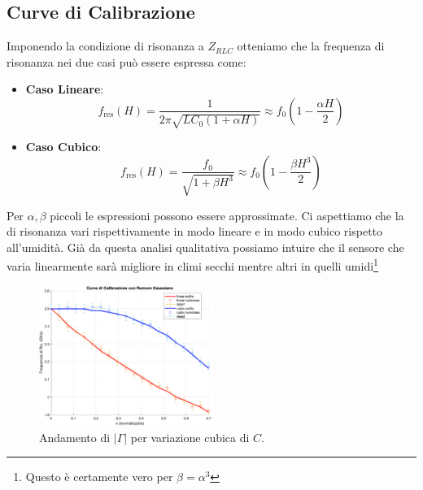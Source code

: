 \documentclass[conference]{IEEEtran}
\begin{document}
\subsection{Curve di Calibrazione}
Imponendo la condizione di risonanza a $Z_{RLC}$ otteniamo che la frequenza di risonanza nei due casi può essere espressa come:


\begin{itemize}
    \item \textbf{Caso Lineare}:
    \[
    f_{\text{res}}(H) = \frac{1}{2\pi\sqrt{L C_0 (1 + \alpha H)}} \approx f_0 \left(1 - \frac{\alpha H}{2}\right)
    \]
    \item \textbf{Caso Cubico}:
    \[
    f_{\text{res}}(H) = \frac{f_0}{\sqrt{1 + \beta H^3}} \approx f_0 \left(1 - \frac{\beta H^3}{2}\right)
    \]
\end{itemize}
Per $\alpha,\beta$ piccoli le espressioni possono essere approssimate. Ci aspettiamo che la di risonanza vari rispettivamente in modo lineare e in modo cubico rispetto all'umidità. Già da questa analisi qualitativa possiamo intuire che il sensore che varia linearmente sarà migliore in climi secchi mentre altri in quelli umidi\footnote{Questo è certamente vero per $\beta = \alpha^3$}
\begin{figure}[h!]
    \centering
    \includegraphics[width=0.5\textwidth]{img/curve.png}
    \caption{Andamento di \(|\Gamma|\) per variazione cubica di \(C\). }
    \label{fig:curve}
\end{figure}
\end{document}
